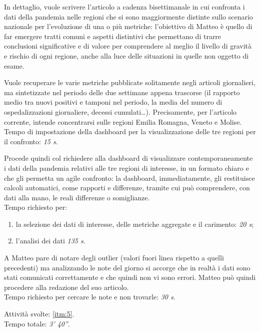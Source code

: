 In dettaglio, vuole scrivere l'articolo a cadenza bisettimanale in cui confronta i dati della pandemia nelle  regioni che si sono maggiormente distinte sullo scenario nazionale per l'evoluzione di una o più metriche: l'obiettivo di Matteo è quello di far emergere tratti comuni e aspetti distintivi che permettano di trarre conclusioni significative e di valore per comprendere al meglio il livello di gravità e rischio di ogni regione, anche alla luce delle situazioni in quelle non oggetto di esame.

Vuole recuperare le varie metriche pubblicate solitamente negli articoli giornalieri, ma sintetizzate nel periodo delle due settimane appena trascorse (il rapporto medio tra nuovi positivi e tamponi nel periodo, la media del numero di ospedalizzazioni giornaliere, decessi cumulati…).
Precisamente, per l'articolo corrente, intende concentrarsi sulle regioni Emilia Romagna, Veneto e Molise.\\
Tempo di impostazione della dashboard per la visualizzazione delle tre regioni per il confronto: \textit{15 s}.

Procede quindi col richiedere alla dashboard di visualizzare contemporaneamente i dati della pandemia relativi alle tre regioni di interesse, in un formato chiaro e che gli permetta un agile confronto: la dashboard, immediatamente, gli restituisce calcoli automatici, come rapporti e differenze, tramite cui può comprendere, con dati alla mano, le reali differenze o somiglianze.\\
Tempo richiesto per:
\begin{enumerate}
    \item la selezione dei dati di interesse, delle metriche aggregate e il carimento: \textit{20 s};
    \item l'analisi dei dati \textit{135 s}.
\end{enumerate}

A Matteo pare di notare degli outlier (valori fuori linea rispetto a quelli precedenti) ma analizzando le note del giorno si accorge che in realtà i dati sono stati comunicati correttamente e che quindi non vi sono errori. Matteo può quindi procedere alla redazione del suo articolo.\\
Tempo richiesto per cercare le note e non trovarle: \textit{30 s}.

\noindent
Attività svolte: \ref{itm:5}.\\  
Tempo totale: \textit{3' 40''}. 

